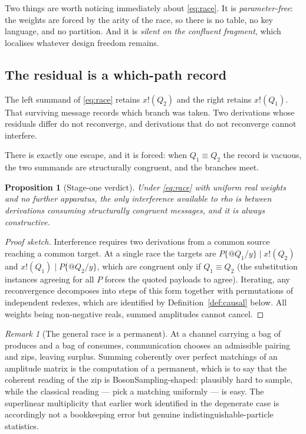 \documentclass[11pt,a4paper]{article}
\theoremstyle{plain}
\newtheorem{proposition}[theorem]{Proposition}
\theoremstyle{definition}
\theoremstyle{remark}
\newtheorem{remark}[theorem]{Remark}
\newcommand{\scong}{\equiv}
\begin{document}
Two things are worth noticing immediately about \eqref{eq:race}. It is
\emph{parameter-free}: the weights are forced by the arity of the race, so there
is no table, no key language, and no partition. And it is \emph{silent on the
confluent fragment}, which localises whatever design freedom remains.

\subsection{The residual is a which-path record}

The left summand of \eqref{eq:race} retains $x!(Q_2)$ and the right retains
$x!(Q_1)$. That surviving message records which branch was taken. Two derivations
whose residuals differ do not reconverge, and derivations that do not reconverge
cannot interfere.

There is exactly one escape, and it is forced: when $Q_1 \scong Q_2$ the record
is vacuous, the two summands are structurally congruent, and the branches meet.

\begin{proposition}[Stage-one verdict]\label{prop:stage1}
Under \eqref{eq:race} with uniform real weights and no further apparatus, the
only interference available to rho is between derivations consuming
structurally congruent messages, and it is always constructive.
\end{proposition}

\begin{proof}[Proof sketch]
Interference requires two derivations from a common source reaching a common
target. At a single race the targets are $P\{@Q_1/y\} \mid x!(Q_2)$ and
$x!(Q_1) \mid P\{@Q_2/y\}$, which are congruent only if $Q_1 \scong Q_2$ (the
substitution instances agreeing for all $P$ forces the quoted payloads to agree).
Iterating, any reconvergence decomposes into steps of this form together with
permutations of independent redexes, which are identified by
Definition~\ref{def:causal} below. All weights being non-negative reals, summed
amplitudes cannot cancel.
\end{proof}

\begin{remark}[The general race is a permanent]\label{rem:permanent}
At a channel carrying a bag of produces and a bag of consumes, communication
chooses an admissible pairing and zips, leaving surplus. Summing coherently over
perfect matchings of an amplitude matrix is the computation of a permanent, which
is to say that the coherent reading of the zip is BosonSampling-shaped: plausibly
hard to sample, while the classical reading --- pick a matching uniformly ---
is easy. The superlinear multiplicity that earlier work identified in the
degenerate case is accordingly not a bookkeeping error but genuine
indistinguishable-particle statistics.
\end{remark}
\end{document}
